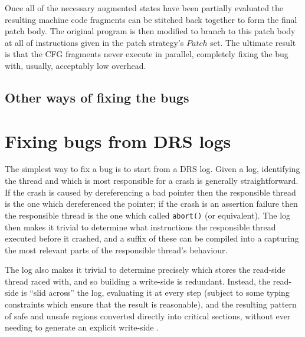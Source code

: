Once all of the necessary augmented states have been partially
evaluated the resulting machine code fragments can be stitched back
together to form the final patch body.  The original program is then
modified to branch to this patch body at all of instructions given in
the patch strategy's $Patch$ set.  The ultimate result is that the CFG
fragments never execute in parallel, completely fixing the bug with,
usually, acceptably low overhead.




\subsection{Other ways of fixing the bugs}


\section{Fixing bugs from DRS logs}
\label{sect:fix_from_drs}
The simplest way to fix a bug is to start from a DRS log.
Given a log, identifying the thread and which is most responsible for a crash is generally straightforward.
If the crash is caused by dereferencing a bad pointer then the responsible thread is the one which dereferenced the pointer; if the crash is an assertion failure then the responsible thread is the one which called \verb|abort()| (or equivalent).
The log then makes it trivial to determine what instructions the responsible thread executed before it crashed, and a suffix of these can be compiled into a \StateMachine capturing the most relevant parts of the responsible thread's behaviour.

The log also makes it trivial to determine precisely which stores the read-side thread raced with, and so building a write-side \StateMachine is redundant.
Instead, the read-side \StateMachine is ``slid across'' the log, evaluating it at every step (subject to some typing constraints which ensure that the result is reasonable), and the resulting pattern of safe and unsafe regions converted directly into critical sections, without ever needing to generate an explicit write-side \StateMachines.

